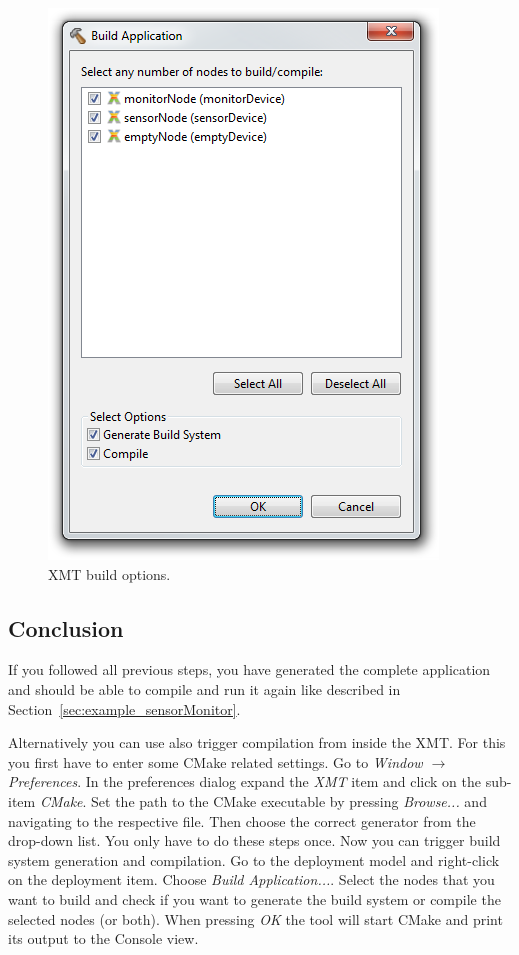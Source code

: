 \begin{figure}[ht]
	\centering
	\includegraphics[scale=0.75]{figures/xmt_deployment_buildWindow.png}
	\caption{XMT build options.}
	\label{fig:xmt_deployment_buildWindow}
\end{figure}

\subsection{Conclusion}
\label{sec:example_xmt:conclusion}

If you followed all previous steps, you have generated the complete application and should be able to compile and run it again like described in Section~\ref{sec:example_sensorMonitor}.

Alternatively you can use also trigger compilation from inside the XMT.
For this you first have to enter some CMake related settings.
Go to \textit{Window $\rightarrow$ Preferences}.
In the preferences dialog expand the \textit{XMT} item and click on the sub-item \textit{CMake}.
Set the path to the CMake executable by pressing \emph{Browse...} and navigating to the respective file.
Then choose the correct generator from the drop-down list.
You only have to do these steps once.
Now you can trigger build system generation and compilation.
Go to the deployment model and right-click on the deployment item.
Choose \emph{Build Application...}.
Select the nodes that you want to build and check if you want to generate the build system or compile the selected nodes (or both).
When pressing \emph{OK} the tool will start CMake and print its output to the Console view.

